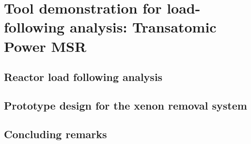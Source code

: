 \chapter{Tool demonstration for load-following analysis: Transatomic Power MSR}

\section{Reactor load following analysis}

\section{Prototype design for the xenon removal system}

\section{Concluding remarks}